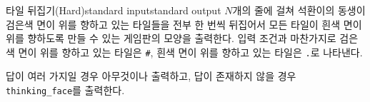 \begin{problem}{타일 뒤집기(Hard)}{standard input}{standard output}
\OutputFile
$N$개의 줄에 걸쳐 석환이의 동생이 검은색 면이 위를 향하고 있는 타일들을 전부 한 번씩 뒤집어서 모든 타일이 흰색 면이 위를 향하도록 만들 수 있는 게임판의 모양을 출력한다. 입력 조건과 마찬가지로 검은색 면이 위를 향하고 있는 타일은 \texttt{\#}, 흰색 면이 위를 향하고 있는 타일은 \texttt{.}로 나타낸다.

답이 여러 가지일 경우 아무것이나 출력하고, 답이 존재하지 않을 경우 \texttt{thinking\_face}를 출력한다.

\Example

\begin{example}
%
%
\end{example}

\end{problem}
